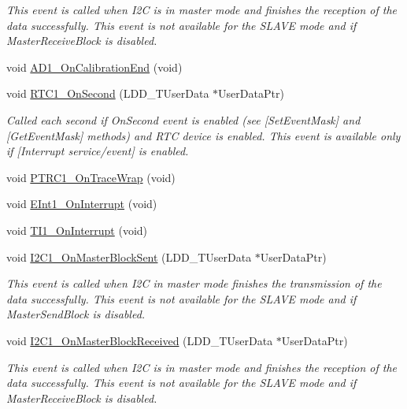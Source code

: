 \begin{DoxyCompactItemize}
\begin{DoxyCompactList}\small\item\em This event is called when I2C is in master mode and finishes the reception of the data successfully. This event is not available for the S\+L\+A\+VE mode and if Master\+Receive\+Block is disabled. \end{DoxyCompactList}\item 
void \hyperlink{group___events__module_ga8be719cad9ac48a9cdfd2281de15ec59}{A\+D1\+\_\+\+On\+Calibration\+End} (void)
\item 
void \hyperlink{group___events__module_ga2f94110e651cb30cba928647e91e92d4}{R\+T\+C1\+\_\+\+On\+Second} (L\+D\+D\+\_\+\+T\+User\+Data $\ast$User\+Data\+Ptr)
\begin{DoxyCompactList}\small\item\em Called each second if On\+Second event is enabled (see \mbox{[}Set\+Event\+Mask\mbox{]} and \mbox{[}Get\+Event\+Mask\mbox{]} methods) and R\+TC device is enabled. This event is available only if \mbox{[}Interrupt service/event\mbox{]} is enabled. \end{DoxyCompactList}\item 
void \hyperlink{group___events__module_gab34bedda0461474d770bfe84c3bc881f}{P\+T\+R\+C1\+\_\+\+On\+Trace\+Wrap} (void)
\item 
void \hyperlink{group___events__module_gabdbc35f3567d6a158efe42b38f2ee47a}{E\+Int1\+\_\+\+On\+Interrupt} (void)
\item 
void \hyperlink{group___events__module_ga01b566cf25a21b34152513dcb1321a11}{T\+I1\+\_\+\+On\+Interrupt} (void)
\item 
void \hyperlink{group___events__module_gad394d39c6e6d080b1ae8cd26178003f2}{I2\+C1\+\_\+\+On\+Master\+Block\+Sent} (L\+D\+D\+\_\+\+T\+User\+Data $\ast$User\+Data\+Ptr)
\begin{DoxyCompactList}\small\item\em This event is called when I2C in master mode finishes the transmission of the data successfully. This event is not available for the S\+L\+A\+VE mode and if Master\+Send\+Block is disabled. \end{DoxyCompactList}\item 
void \hyperlink{group___events__module_gad0eaee8bf9e6df0596ba2542bb3e1c32}{I2\+C1\+\_\+\+On\+Master\+Block\+Received} (L\+D\+D\+\_\+\+T\+User\+Data $\ast$User\+Data\+Ptr)
\begin{DoxyCompactList}\small\item\em This event is called when I2C is in master mode and finishes the reception of the data successfully. This event is not available for the S\+L\+A\+VE mode and if Master\+Receive\+Block is disabled. \end{DoxyCompactList}\end{DoxyCompactItemize}


